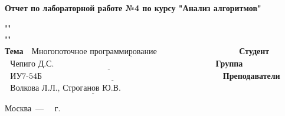 \begin{titlepage}
	
	\begin{center}
		\Large\textbf{Отчет по лабораторной работе №4 по курсу "Анализ алгоритмов"}
	\end{center}

""\\
""\\
	
	\noindent\textbf{Тема} $\underline{\text{~~Многопоточное программирование~~~~~~~~~~~~~~~~~~~~~~~~~~~~~}}$\newline\newline\newline
	\noindent\textbf{Студент} $\underline{\text{~~Чепиго Д.С. ~~~~~~~~~~~~~~~~~~~~~~~~~~~~~~~~~~~~~~~~~~~~~~~~~~~~~~~~~}}$\newline\newline
	\noindent\textbf{Группа} $\underline{\text{~~ИУ7-54Б~~~~~~~~~~~~~~~~~~~~~~~~~~~~~~~~~~~~~~~~~~~~~~~~~~~~~~~~~~~~~~~~~}}$\newline\newline
	\noindent\textbf{Преподаватели} $\underline{\text{~~Волкова Л.Л., Строганов Ю.В.~~~~~~~~~~~~~~~~~~~~~~}}$\newline
	
	\begin{center}
		\vfill
		Москва~---~\the\year
		~г.
	\end{center}
	\restoregeometry
\end{titlepage}


